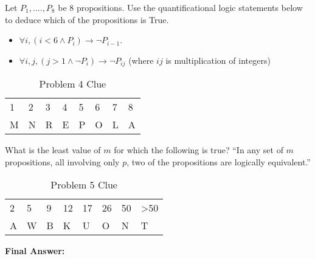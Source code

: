 \documentclass[solution, letterpaper]{cs20inclass}
\begin{document}
\begin{solution}
\end{solution}

\problem Let $P_1, ...., P_8$ be 8 propositions. Use the quantificational logic statements below to deduce which of the propositions is True.

\begin{itemize}
\item $\forall i, (i < 6 \wedge P_i) \to \neg P_{i-1}$.
\item $\forall i, j, (j > 1 \wedge \neg P_i) \to \neg P_{ij}$ (where $ij$ is multiplication of integers)
\end{itemize}

\begin{table}[h]
\centering
\begin{tabular}{llllllll}
1 & 2 & 3 & 4 & 5 & 6 & 7 & 8 \\
M & N & R & E & P & O & L & A
\end{tabular}
\caption{Problem 4 Clue}
\end{table}

\begin{solution}
\end{solution}

\problem What is the least value of $m$ for which the following is true? ``In any set of $m$ propositions, all involving only $p$, two of the propositions are logically equivalent.''

\begin{table}[h]
\centering
\begin{tabular}{llllllll}
2 & 5 & 9 & 12 & 17 & 26 & 50 & >50 \\
A & W & B & K & U & O & N & T
\end{tabular}
\caption{Problem 5 Clue}
\end{table}

\begin{solution}
\end{solution}

\problem \textbf{Final Answer: }

\begin{solution}
\end{solution}
\end{document}
